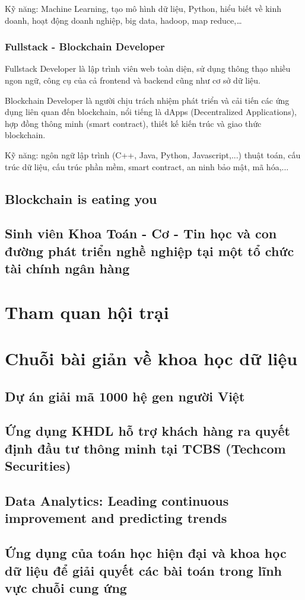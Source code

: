 \documentclass[14pt, a4paper]{article}
\numberwithin{equation}{section}
\numberwithin{figure}{section}
\numberwithin{dl}{section}
\numberwithin{md}{section}
\numberwithin{bd}{section}
\numberwithin{dn}{section}
\numberwithin{hq}{section}
\begin{document}
    Kỹ năng: Machine Learning, tạo mô hình dữ liệu, Python, hiểu biết về kinh doanh, hoạt động doanh nghiệp, big data, hadoop, map reduce,\dots

    \subsubsection{Fullstack - Blockchain Developer}

    Fullstack Developer là lập trình viên web toàn diện, sử dụng thông thạo nhiều ngon ngữ, công cụ của cả frontend và backend cũng như cơ sở dữ liệu.

    Blockchain Developer là người chịu trách nhiệm phát triển và cải tiến các ứng dụng liên quan đến blockchain, nổi tiếng là dApps (Decentralized Applications), hợp đồng thông minh (smart contract), thiết kế kiến trúc và giao thức blockchain.

    Kỹ năng: ngôn ngữ lập trình (C++, Java, Python, Javascript,...) thuật toán, cấu trúc dữ liệu, cấu trúc phần mềm, smart contract, an ninh bảo mật, mã hóa,...

    \subsection{Blockchain is eating you}

    \subsection{Sinh viên Khoa Toán - Cơ - Tin học và con đường phát triển nghề nghiệp tại một tổ chức tài chính ngân hàng}

    \section{Tham quan hội trại}

    \section{Chuỗi bài giản về khoa học dữ liệu}

    \subsection{Dự án giải mã 1000 hệ gen người Việt}

    \subsection{Ứng dụng KHDL hỗ trợ khách hàng ra quyết định đầu tư thông minh tại TCBS (Techcom Securities)}

    \subsection{Data Analytics: Leading continuous improvement and predicting trends}

    \subsection{Ứng dụng của toán học hiện đại và khoa học dữ liệu để giải quyết các bài toán trong lĩnh vực chuỗi cung ứng}
\end{document}
